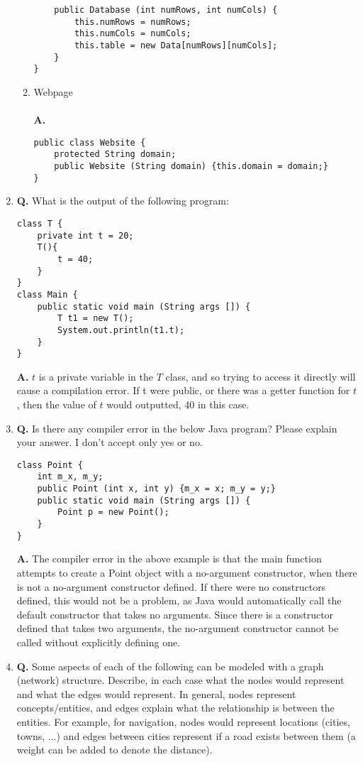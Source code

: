 \documentclass[12pt]{article}
\begin{document}
\begin{enumerate}
\begin{enumerate}[label=(\alph*)]
\begin{lstlisting}
	public Database (int numRows, int numCols) {
		this.numRows = numRows;
		this.numCols = numCols;
		this.table = new Data[numRows][numCols];
	}
}
    \end{lstlisting}
    \item Webpage
    \\\\
    \textbf{A.} 
    \begin{lstlisting}
public class Website {
	protected String domain;
	public Website (String domain) {this.domain = domain;}
}
    \end{lstlisting}
  \end{enumerate}
  \item
  \textbf{Q.} What is the output of the following program:
  \begin{lstlisting}
class T {
	private int t = 20;
	T(){
		t = 40;
	}
}
class Main {
	public static void main (String args []) {
		T t1 = new T();
		System.out.println(t1.t);
	}
}
  \end{lstlisting}
  \textbf{A.} $t$ is a private variable in the $T$ class, and so trying to access it directly will cause a compilation error. If t were public, or there was a getter function for $t$, then the value of $t$ would outputted, 40 in this case.
  \item
  \textbf{Q.} Is there any compiler error in the below Java program? Please explain your answer. I don't accept only yes or no.
  \begin{lstlisting}
class Point {
	int m_x, m_y;
	public Point (int x, int y) {m_x = x; m_y = y;}
	public static void main (String args []) {
		Point p = new Point();
	}
}
  \end{lstlisting}
  \textbf{A.} The compiler error in the above example is that the main function attempts to create a Point object with a no-argument constructor, when there is not a no-argument constructor defined. If there were no constructors defined, this would not be a problem, as Java would automatically call the default constructor that takes no arguments. Since there is a constructor defined that takes two arguments, the no-argument constructor cannot be called without explicitly defining one.
  \item
  \textbf{Q.} Some aspects of each of the following can be modeled with a graph (network) structure. Describe, in each case what the nodes would represent and what the edges would represent. In general, nodes represent concepts/entities, and edges explain what the relationship is between the entities. For example, for navigation, nodes would represent locations (cities, towns, ...) and edges between cities represent if a road exists between them (a weight can be added to denote the distance).

\end{enumerate}
\end{document}
